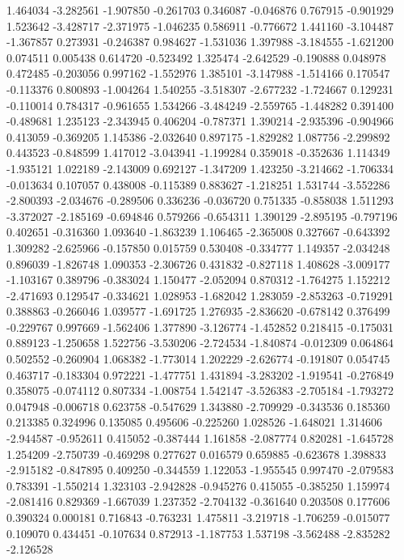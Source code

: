 1.464034
-3.282561
-1.907850
-0.261703
0.346087
-0.046876
0.767915
-0.901929
1.523642
-3.428717
-2.371975
-1.046235
0.586911
-0.776672
1.441160
-3.104487
-1.367857
0.273931
-0.246387
0.984627
-1.531036
1.397988
-3.184555
-1.621200
0.074511
0.005438
0.614720
-0.523492
1.325474
-2.642529
-0.190888
0.048978
0.472485
-0.203056
0.997162
-1.552976
1.385101
-3.147988
-1.514166
0.170547
-0.113376
0.800893
-1.004264
1.540255
-3.518307
-2.677232
-1.724667
0.129231
-0.110014
0.784317
-0.961655
1.534266
-3.484249
-2.559765
-1.448282
0.391400
-0.489681
1.235123
-2.343945
0.406204
-0.787371
1.390214
-2.935396
-0.904966
0.413059
-0.369205
1.145386
-2.032640
0.897175
-1.829282
1.087756
-2.299892
0.443523
-0.848599
1.417012
-3.043941
-1.199284
0.359018
-0.352636
1.114349
-1.935121
1.022189
-2.143009
0.692127
-1.347209
1.423250
-3.214662
-1.706334
-0.013634
0.107057
0.438008
-0.115389
0.883627
-1.218251
1.531744
-3.552286
-2.800393
-2.034676
-0.289506
0.336236
-0.036720
0.751335
-0.858038
1.511293
-3.372027
-2.185169
-0.694846
0.579266
-0.654311
1.390129
-2.895195
-0.797196
0.402651
-0.316360
1.093640
-1.863239
1.106465
-2.365008
0.327667
-0.643392
1.309282
-2.625966
-0.157850
0.015759
0.530408
-0.334777
1.149357
-2.034248
0.896039
-1.826748
1.090353
-2.306726
0.431832
-0.827118
1.408628
-3.009177
-1.103167
0.389796
-0.383024
1.150477
-2.052094
0.870312
-1.764275
1.152212
-2.471693
0.129547
-0.334621
1.028953
-1.682042
1.283059
-2.853263
-0.719291
0.388863
-0.266046
1.039577
-1.691725
1.276935
-2.836620
-0.678142
0.376499
-0.229767
0.997669
-1.562406
1.377890
-3.126774
-1.452852
0.218415
-0.175031
0.889123
-1.250658
1.522756
-3.530206
-2.724534
-1.840874
-0.012309
0.064864
0.502552
-0.260904
1.068382
-1.773014
1.202229
-2.626774
-0.191807
0.054745
0.463717
-0.183304
0.972221
-1.477751
1.431894
-3.283202
-1.919541
-0.276849
0.358075
-0.074112
0.807334
-1.008754
1.542147
-3.526383
-2.705184
-1.793272
0.047948
-0.006718
0.623758
-0.547629
1.343880
-2.709929
-0.343536
0.185360
0.213385
0.324996
0.135085
0.495606
-0.225260
1.028526
-1.648021
1.314606
-2.944587
-0.952611
0.415052
-0.387444
1.161858
-2.087774
0.820281
-1.645728
1.254209
-2.750739
-0.469298
0.277627
0.016579
0.659885
-0.623678
1.398833
-2.915182
-0.847895
0.409250
-0.344559
1.122053
-1.955545
0.997470
-2.079583
0.783391
-1.550214
1.323103
-2.942828
-0.945276
0.415055
-0.385250
1.159974
-2.081416
0.829369
-1.667039
1.237352
-2.704132
-0.361640
0.203508
0.177606
0.390324
0.000181
0.716843
-0.763231
1.475811
-3.219718
-1.706259
-0.015077
0.109070
0.434451
-0.107634
0.872913
-1.187753
1.537198
-3.562488
-2.835282
-2.126528
